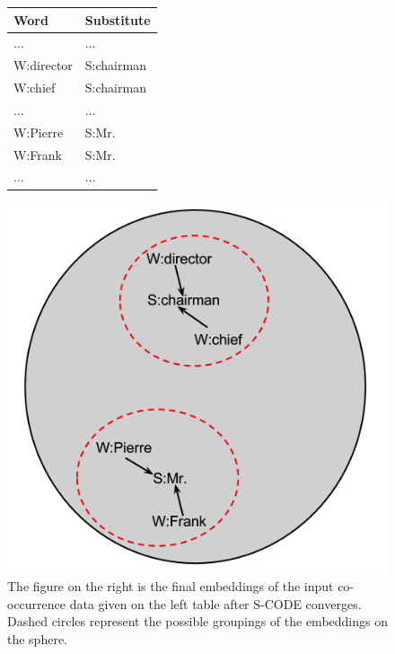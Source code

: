 \begin{figure}[htb]
\centering
  \begin{minipage}[c]{0.38\textwidth}
    \begin{tabular}{|l|l|}
    \hline
    \textbf{Word} & \textbf{Substitute} \\
    \hline
    $\hdots$&$\hdots$\\
    W:director & S:chairman \\
    W:chief & S:chairman \\
    $\hdots$&$\hdots$\\
    W:Pierre & S:Mr. \\
    W:Frank & S:Mr. \\
    $\hdots$&$\hdots$\\
    \hline
  \end{tabular}
  \end{minipage}
  \begin{minipage}[c]{0.48\textwidth}
    \includegraphics[height=\textwidth]{scode-ex.png}
  \end{minipage}
  \caption{The figure on the right is the final embeddings of the
    input co-occurrence data given on the left table after S-CODE
    converges.  Dashed circles represent the possible groupings of the
    embeddings on the sphere.}
\end{figure}

